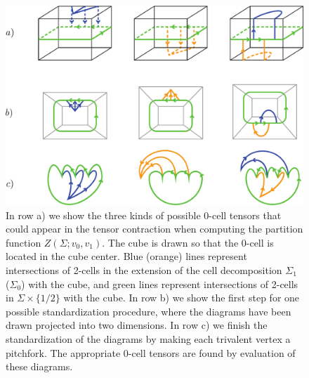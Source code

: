 \documentclass[12pt,a4paper]{article}
\begin{document}
\begin{figure}
\begin{center}
\includegraphics[scale=0.6]{StandardizedSlabTensors.pdf}
\caption{\label{StandardizedSlabTensors}
In row a) we show the three kinds of possible 0-cell tensors that could appear in the tensor contraction when 
computing the partition function $Z(\Sigma;v_0,v_1)$. The cube is drawn so that the 0-cell is located in the cube center. 
Blue (orange) lines represent intersections of 2-cells in the extension of the cell decomposition $\Sigma_1$ ($\Sigma_0$) with the cube, and 
green lines represent intersections of 2-cells in $\Sigma \times \{1/2\}$ with the cube. 
In row b) we show the first step for one possible standardization procedure, where the diagrams 
have been drawn projected into two dimensions. 
In row c) we finish the standardization of the diagrams by making each trivalent vertex a pitchfork. The appropriate 0-cell 
tensors are found by evaluation of these diagrams. 
}
\end{center}
\end{figure}
\end{document}
